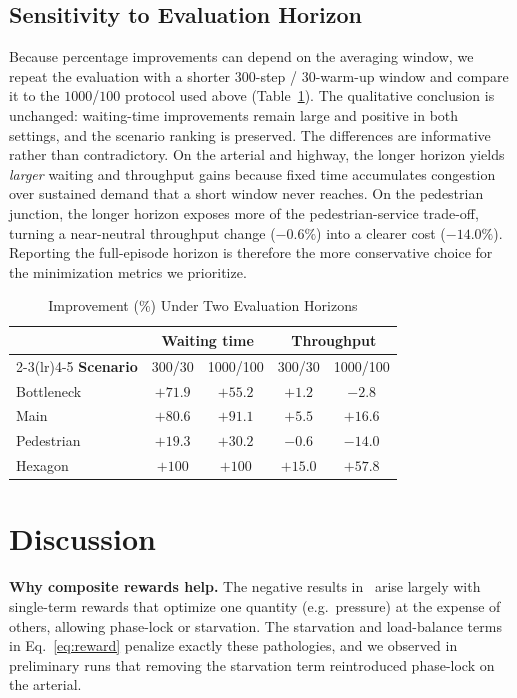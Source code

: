 \documentclass[conference,a4paper]{IEEEtran}
\begin{document}
\subsection{Sensitivity to Evaluation Horizon}
Because percentage improvements can depend on the averaging window, we repeat the
evaluation with a shorter $300$-step / $30$-warm-up window and compare it to the
$1000$/$100$ protocol used above (Table~\ref{tab:horizon}). The qualitative
conclusion is unchanged: waiting-time improvements remain large and positive in
both settings, and the scenario ranking is preserved. The differences are
informative rather than contradictory. On the arterial and highway, the longer
horizon yields \emph{larger} waiting and throughput gains because fixed time
accumulates congestion over sustained demand that a short window never reaches.
On the pedestrian junction, the longer horizon exposes more of the
pedestrian-service trade-off, turning a near-neutral throughput change
($-0.6\%$) into a clearer cost ($-14.0\%$). Reporting the full-episode horizon is
therefore the more conservative choice for the minimization metrics we
prioritize.

\begin{table}[t]
\caption{Improvement (\%) Under Two Evaluation Horizons}
\label{tab:horizon}
\centering
\small
\begin{tabular}{@{}lcccc@{}}
\toprule
 & \multicolumn{2}{c}{\textbf{Waiting time}} & \multicolumn{2}{c}{\textbf{Throughput}} \\
\cmidrule(lr){2-3}\cmidrule(lr){4-5}
\textbf{Scenario} & 300/30 & 1000/100 & 300/30 & 1000/100 \\
\midrule
Bottleneck & $+71.9$ & $+55.2$ & $+1.2$  & $-2.8$  \\
Main       & $+80.6$ & $+91.1$ & $+5.5$  & $+16.6$ \\
Pedestrian & $+19.3$ & $+30.2$ & $-0.6$  & $-14.0$ \\
Hexagon    & $+100$  & $+100$  & $+15.0$ & $+57.8$ \\
\bottomrule
\end{tabular}
\end{table}

\section{Discussion}
\textbf{Why composite rewards help.}
The negative results in~\cite{nguyen2025robustness} arise largely with single-term
rewards that optimize one quantity (e.g.\ pressure) at the expense of others,
allowing phase-lock or starvation. The starvation and load-balance terms in
Eq.~\ref{eq:reward} penalize exactly these pathologies, and we observed in
preliminary runs that removing the starvation term reintroduced phase-lock on the
arterial.
\end{document}
